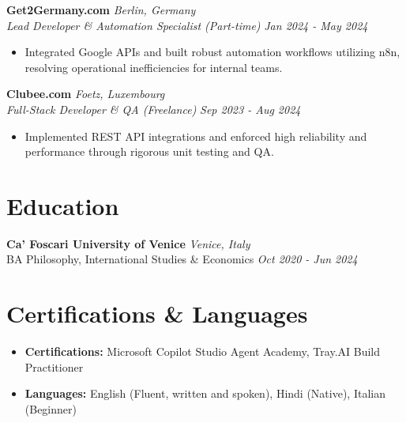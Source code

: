 \documentclass[11pt,a4paper]{article}
\begin{document}
\vspace{1ex}
\noindent
\textbf{Get2Germany.com} \hfill \textit{Berlin, Germany} \\
\textit{Lead Developer \& Automation Specialist (Part-time)} \hfill \textit{Jan 2024 - May 2024}
\begin{itemize}[leftmargin=*,noitemsep]
    \item Integrated Google APIs and built robust automation workflows utilizing n8n, resolving operational inefficiencies for internal teams.
\end{itemize}

\vspace{1ex}
\noindent
\textbf{Clubee.com} \hfill \textit{Foetz, Luxembourg} \\
\textit{Full-Stack Developer \& QA (Freelance)} \hfill \textit{Sep 2023 - Aug 2024}
\begin{itemize}[leftmargin=*,noitemsep]
    \item Implemented REST API integrations and enforced high reliability and performance through rigorous unit testing and QA.
\end{itemize}

\section*{Education}
\noindent
\textbf{Ca' Foscari University of Venice} \hfill \textit{Venice, Italy} \\
BA Philosophy, International Studies \& Economics \hfill \textit{Oct 2020 - Jun 2024}

\section*{Certifications \& Languages}
\begin{itemize}[leftmargin=*,noitemsep]
    \item \textbf{Certifications:} Microsoft Copilot Studio Agent Academy, Tray.AI Build Practitioner
    \item \textbf{Languages:} English (Fluent, written and spoken), Hindi (Native), Italian (Beginner)
\end{itemize}
\end{document}
